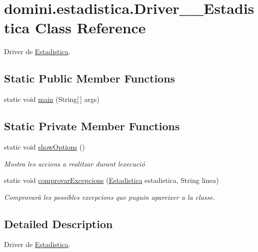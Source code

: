 \hypertarget{classdomini_1_1estadistica_1_1Driver____Estadistica}{}\section{domini.\+estadistica.\+Driver\+\_\+\+\_\+\+Estadistica Class Reference}
\label{classdomini_1_1estadistica_1_1Driver____Estadistica}


Driver de \hyperlink{classdomini_1_1estadistica_1_1Estadistica}{Estadistica}.  


\subsection*{Static Public Member Functions}
\begin{DoxyCompactItemize}
\item 
static void \hyperlink{classdomini_1_1estadistica_1_1Driver____Estadistica_a7f11e0ccad919e427af9c591cf910bfe}{main} (String\mbox{[}$\,$\mbox{]} args)
\end{DoxyCompactItemize}
\subsection*{Static Private Member Functions}
\begin{DoxyCompactItemize}
\item 
static void \hyperlink{classdomini_1_1estadistica_1_1Driver____Estadistica_ab42f06b8996094e10bd087ccf2f749e7}{show\+Options} ()
\begin{DoxyCompactList}\small\item\em Mostra les accions a realitzar durant l\textquotesingle{}execució \end{DoxyCompactList}\item 
static void \hyperlink{classdomini_1_1estadistica_1_1Driver____Estadistica_a3459f11af9841b23ac81a409a3e84e22}{comprovar\+Excepcions} (\hyperlink{classdomini_1_1estadistica_1_1Estadistica}{Estadistica} estadistica, String linea)
\begin{DoxyCompactList}\small\item\em Comprovarà les possibles excepcions que puguin apareixer a la classe. \end{DoxyCompactList}\end{DoxyCompactItemize}


\subsection{Detailed Description}
Driver de \hyperlink{classdomini_1_1estadistica_1_1Estadistica}{Estadistica}. 

